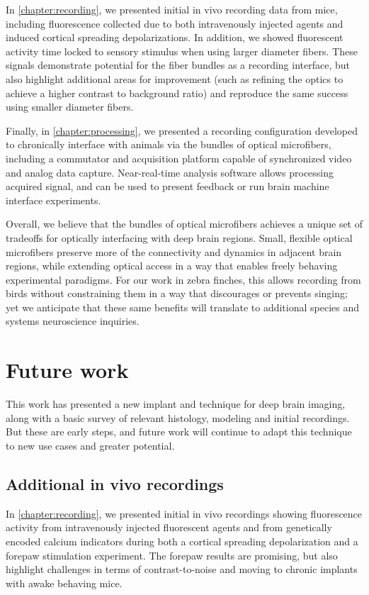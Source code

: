 In \cref{chapter:recording}, we presented initial 
in vivo recording data from mice, including fluorescence 
collected due to both intravenously injected agents 
and induced cortical spreading depolarizations. 
In addition, we showed fluorescent activity time 
locked to sensory stimulus when using larger diameter 
fibers. These signals demonstrate potential for the 
fiber bundles as a recording interface, but also 
highlight additional areas for improvement (such 
as refining the optics to achieve a higher 
contrast to background ratio) and 
reproduce the same success using smaller 
diameter fibers.

Finally, in \cref{chapter:processing}, we 
presented a recording configuration developed to chronically 
interface with animals via the bundles of optical 
microfibers, including a commutator and acquisition 
platform capable of synchronized video and analog 
data capture. Near-real-time analysis software 
allows processing acquired signal, and can be 
used to present feedback or run brain machine 
interface experiments.

Overall, we believe that the bundles of optical 
microfibers achieves a unique set of tradeoffs 
for optically interfacing with deep brain regions. 
Small, flexible optical microfibers preserve 
more of the connectivity and dynamics in adjacent 
brain regions, while extending optical access in a 
way that enables freely behaving experimental 
paradigms. For our work in zebra finches, this 
allows recording from birds without constraining 
them in a way that discourages or prevents singing; 
yet we anticipate that these same benefits will 
translate to additional species and systems 
neuroscience inquiries.

\section{Future work}

This work has presented a new implant and technique
for deep brain imaging, along with a basic survey of 
relevant histology, modeling and initial recordings. 
But these are early steps, and future work will 
continue to adapt this technique to new use cases
and greater potential.

\subsection{Additional in vivo recordings}

In \cref{chapter:recording}, we presented initial 
in vivo recordings showing fluorescence activity 
from intravenously injected fluorescent agents and 
from genetically encoded calcium indicators during 
both a cortical spreading depolarization and a 
forepaw stimulation experiment. The forepaw results 
are promising, but also highlight challenges in 
terms of contrast-to-noise and moving to chronic 
implants with awake behaving mice.


